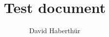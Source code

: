 \documentclass{article}
\title{Test document}
\author{David Haberthür}
\date{}
\begin{document}
\maketitle

\lipsum
\end{document}
